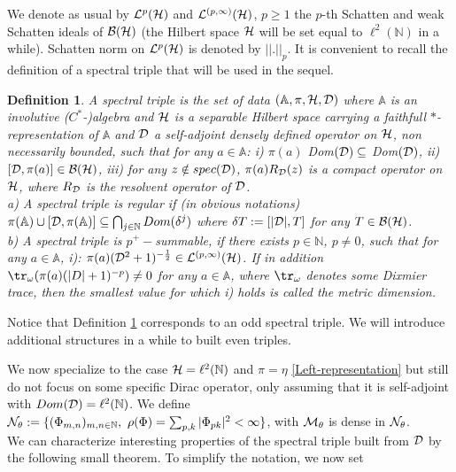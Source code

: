 \documentclass[a4paper]{jpconf}
\numberwithin{equation}{section}
\newtheorem{definition}[Theorem]{Definition}
\theoremstyle{nonumberplain}
\begin{document}
We denote as usual by ${\cal{L}}^p({\cal{H}})$ and ${\cal{L}}^{(p,\infty)}({\cal{H}})$, $p\ge1$ the $p$-th Schatten and weak Schatten ideals of ${\cal{B}}({\cal{H}})$ (the Hilbert space ${\cal{H}}$ will be set equal to $\ell^2(\mathbb{N})$ in a while). Schatten norm on ${\cal{L}}^p({\cal{H}})$ is denoted by $||.||_p$. It is convenient to recall the definition of a spectral triple that will be used in the sequel.
\begin{definition}\label{spect-triple}
A spectral triple is the set of data $(\mathbb{A},\pi,{\cal{H}},{\cal{D}})$ where $\mathbb{A}$ is an involutive ($C^*$-)algebra and ${\cal{H}}$ is a separable Hilbert space carrying a faithfull $*$-representation of $\mathbb{A}$ and  ${\cal{D}}$ a self-adjoint densely defined operator on ${\cal{H}}$, non necessarily bounded, such that for any $a\in\mathbb{A}$: i) $\pi(a)$ Dom$({\cal{D}})\subseteq$ Dom$({\cal{D}})$, ii) $[{\cal{D}},\pi(a)]\in{\cal{B}}({\cal{H}})$, iii) for any $z\notin spec({\cal{D}})$, $\pi(a)R_{{\cal{D}}}(z)$ is a compact operator on ${\cal{H}}$, where $R_{{\cal{D}}}$ is the resolvent operator of ${\cal{D}}$. \\
a) A spectral triple is regular if (in obvious notations) $\pi(\mathbb{A})\cup[{\cal{D}},\pi(\mathbb{A})]\subseteq\bigcap_{j\in\mathbb{N}}Dom(\delta^j)$ where $\delta T:=[|{\cal{D}}|,T]$ for any $T\in{\cal{B}}({\cal{H}})$.\\
b) A spectral triple is $p^+-$summable, if there exists $p\in\mathbb{N}$, $p\ne0$, such that for any $a\in\mathbb{A}$, i): $\pi(a)({\cal{D}}^2+1)^{-\frac{1}{2}}\in{\cal{L}}^{(p,\infty)}({\cal{H}})$. If in addition $\tr_\omega(\pi(a)(|D|+1)^{-p})\ne0$ for any $a\in\mathbb{A}$, where $\tr_\omega$ denotes some Dixmier trace, then the smallest value for which i) holds is called the metric dimension.
\end{definition}
Notice that Definition \ref{spect-triple} corresponds to an odd spectral triple. We will introduce additional structures in a while to built even triples.\par
We now specialize to the case ${\cal{H}}=\ell^2(\mathbb{N})$ and $\pi=\eta$ \eqref{Left-representation} but still do not focus on some specific Dirac operator, only assuming that it is self-adjoint with $Dom({\cal{D}})=\ell^2(\mathbb{N})$. We define ${ {\cal{N}}_\theta}:=\{(\Phi_{m,n})_{m,n\in\mathbb{N}},\ \rho(\Phi)=\sum_{p,k}|\Phi_{pk}|^2<\infty\}$, with ${\cal{M}}_\theta$ is dense in ${\cal{N}}_\theta$.\\
We can characterize interesting properties of the spectral triple built from ${\cal{D}}$ by the following small theorem. To simplify the notation, we now set 
\end{document}
